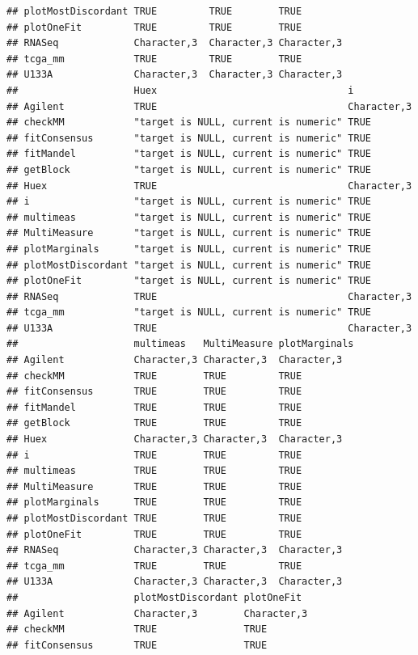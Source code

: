 \documentclass{article}\usepackage[]{graphicx}\usepackage[]{color}
\makeatletter
\newenvironment{kframe}{%
 \def\at@end@of@kframe{}%
 \ifinner\ifhmode%
  \def\at@end@of@kframe{\end{minipage}}%
  \begin{minipage}{\columnwidth}%
 \fi\fi%
 \def\FrameCommand##1{\hskip\@totalleftmargin \hskip-\fboxsep
 \colorbox{shadecolor}{##1}\hskip-\fboxsep
     \hskip-\linewidth \hskip-\@totalleftmargin \hskip\columnwidth}%
 \MakeFramed {\advance\hsize-\width
   \@totalleftmargin\z@ \linewidth\hsize
   \@setminipage}}%
 {\par\unskip\endMakeFramed%
 \at@end@of@kframe}
\newenvironment{knitrout}{}{} %
\makeatother
\begin{document}
\begin{knitrout}
\begin{kframe}
\begin{verbatim}
## plotMostDiscordant TRUE         TRUE        TRUE       
## plotOneFit         TRUE         TRUE        TRUE       
## RNASeq             Character,3  Character,3 Character,3
## tcga_mm            TRUE         TRUE        TRUE       
## U133A              Character,3  Character,3 Character,3
##                    Huex                                 i          
## Agilent            TRUE                                 Character,3
## checkMM            "target is NULL, current is numeric" TRUE       
## fitConsensus       "target is NULL, current is numeric" TRUE       
## fitMandel          "target is NULL, current is numeric" TRUE       
## getBlock           "target is NULL, current is numeric" TRUE       
## Huex               TRUE                                 Character,3
## i                  "target is NULL, current is numeric" TRUE       
## multimeas          "target is NULL, current is numeric" TRUE       
## MultiMeasure       "target is NULL, current is numeric" TRUE       
## plotMarginals      "target is NULL, current is numeric" TRUE       
## plotMostDiscordant "target is NULL, current is numeric" TRUE       
## plotOneFit         "target is NULL, current is numeric" TRUE       
## RNASeq             TRUE                                 Character,3
## tcga_mm            "target is NULL, current is numeric" TRUE       
## U133A              TRUE                                 Character,3
##                    multimeas   MultiMeasure plotMarginals
## Agilent            Character,3 Character,3  Character,3  
## checkMM            TRUE        TRUE         TRUE         
## fitConsensus       TRUE        TRUE         TRUE         
## fitMandel          TRUE        TRUE         TRUE         
## getBlock           TRUE        TRUE         TRUE         
## Huex               Character,3 Character,3  Character,3  
## i                  TRUE        TRUE         TRUE         
## multimeas          TRUE        TRUE         TRUE         
## MultiMeasure       TRUE        TRUE         TRUE         
## plotMarginals      TRUE        TRUE         TRUE         
## plotMostDiscordant TRUE        TRUE         TRUE         
## plotOneFit         TRUE        TRUE         TRUE         
## RNASeq             Character,3 Character,3  Character,3  
## tcga_mm            TRUE        TRUE         TRUE         
## U133A              Character,3 Character,3  Character,3  
##                    plotMostDiscordant plotOneFit 
## Agilent            Character,3        Character,3
## checkMM            TRUE               TRUE       
## fitConsensus       TRUE               TRUE       

\end{verbatim}
\end{kframe}
\end{knitrout}
\end{document}
